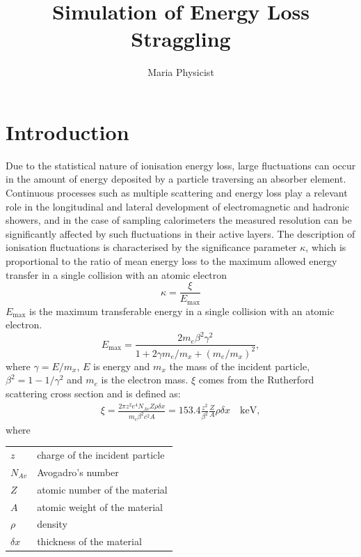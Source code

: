 \documentclass{article}
\title{Simulation of  Energy Loss  Straggling}
\author{Maria Physicist}
\let\SetRowColor\relax
\newcommand{\Emax}{\ensuremath{E_{\mathrm{max}}}}
\begin{document}
\maketitle

\section{Introduction}

Due to the statistical nature of ionisation energy loss, large
fluctuations can occur in the amount of energy deposited by a particle
traversing an absorber element.  Continuous processes such as multiple
scattering and energy loss play a relevant role in the longitudinal
and lateral development of electromagnetic and hadronic
showers, and in the case of sampling calorimeters the
measured resolution can be significantly affected by such fluctuations
in their active layers.  The description of ionisation fluctuations is
characterised by the significance parameter $\kappa$, which is
proportional to the ratio of mean energy loss to the maximum allowed
energy transfer in a single collision with an atomic electron
\[
\kappa =\frac{\xi}{\Emax}
\]
\Emax{}
is the maximum transferable energy in a single collision with
an atomic electron.
\[
\Emax =\frac{2 m_e \beta^2\gamma^2 }
{1 +  2\gamma m_e/m_x + \left ( m_e/m_x\right)^2},
\]
where $\gamma = E/m_x$, $E$ is energy and
$m_x$ the mass of the incident particle,
$\beta^2 = 1 - 1/\gamma^2$ and $m_e$ is the electron mass.
$\xi$ comes from the Rutherford scattering cross  section
and is defined as:
\begin{eqnarray*} \xi  = \frac{2\pi z^2 e^4 N_{Av} Z \rho \delta x}
        {m_e \beta^2 c^2 A} =  153.4 \frac{z^2} {\beta^2} \frac{Z}{A}
  \rho \delta x \quad\mathrm{keV},
\end{eqnarray*}
where

\begin{tabular}{ll}
\SetRowColor $z$          & charge of the incident particle \\
\SetRowColor $N_{Av}$     & Avogadro's number \\
\SetRowColor $Z$          & atomic number of the material \\
\SetRowColor $A$          & atomic weight of the material \\
\SetRowColor $\rho$       & density \\
\SetRowColor $ \delta x$  & thickness of the material \\
\end{tabular}
\end{document}
